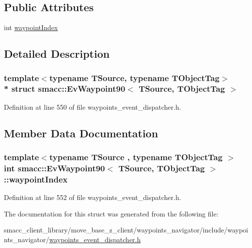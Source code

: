 \subsection*{Public Attributes}
\begin{DoxyCompactItemize}
\item 
int \hyperlink{structsmacc_1_1EvWaypoint90_a3aaa36709c9f3031112bd9dabe9d4eac}{waypoint\+Index}
\end{DoxyCompactItemize}


\subsection{Detailed Description}
\subsubsection*{template$<$typename T\+Source, typename T\+Object\+Tag$>$\\*
struct smacc\+::\+Ev\+Waypoint90$<$ T\+Source, T\+Object\+Tag $>$}



Definition at line 550 of file waypoints\+\_\+event\+\_\+dispatcher.\+h.



\subsection{Member Data Documentation}
\subsubsection[{\texorpdfstring{waypoint\+Index}{waypointIndex}}]{\setlength{\rightskip}{0pt plus 5cm}template$<$typename T\+Source , typename T\+Object\+Tag $>$ int {\bf smacc\+::\+Ev\+Waypoint90}$<$ T\+Source, T\+Object\+Tag $>$\+::waypoint\+Index}\hypertarget{structsmacc_1_1EvWaypoint90_a3aaa36709c9f3031112bd9dabe9d4eac}{}\label{structsmacc_1_1EvWaypoint90_a3aaa36709c9f3031112bd9dabe9d4eac}


Definition at line 552 of file waypoints\+\_\+event\+\_\+dispatcher.\+h.



The documentation for this struct was generated from the following file\+:\begin{DoxyCompactItemize}
\item 
smacc\+\_\+client\+\_\+library/move\+\_\+base\+\_\+z\+\_\+client/waypoints\+\_\+navigator/include/waypoints\+\_\+navigator/\hyperlink{waypoints__event__dispatcher_8h}{waypoints\+\_\+event\+\_\+dispatcher.\+h}\end{DoxyCompactItemize}
